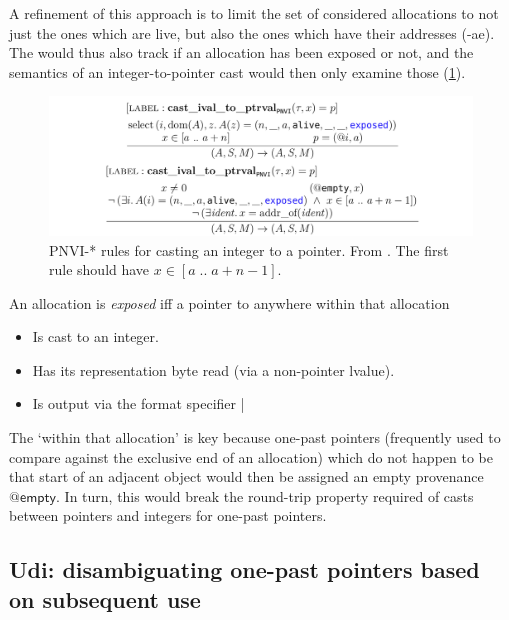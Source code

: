 A refinement of this approach is to limit the set of considered allocations to
not just the ones which are live, but also the ones which have their addresses
 (-ae). The  would thus also track if an
allocation has been exposed or not, and the semantics of an integer-to-pointer
cast would then only examine those (\cref{fig:pnvi-ival-to-pval}).

\begin{figure}
    \includegraphics{figures/mem-model-pnvi-ival-to-pval}
    \caption{PNVI-* rules for casting an integer to a pointer. From
    \textcite{memarian2022cerberus}. The first rule should have $x \in [ a \;
        .. \; a + n - 1]$.}\label{fig:pnvi-ival-to-pval}
\end{figure}

\begin{definition}
An allocation is \emph{exposed} iff a pointer to anywhere within that
allocation
\begin{itemize}
    \item Is cast to an integer.
    \item Has its representation byte read (via a non-pointer lvalue).
    \item Is output via the format specifier \cinline|%
\end{itemize}
\end{definition}

The `within that allocation' is key because one-past pointers (frequently used
to compare against the exclusive end of an allocation) which do not happen to
be that start of an adjacent object would then be assigned an empty provenance
$\mathsf{@empty}$. In turn, this would break the round-trip property required
of casts between pointers and integers for one-past pointers.

\subsection{Udi: disambiguating one-past pointers based on subsequent use}

